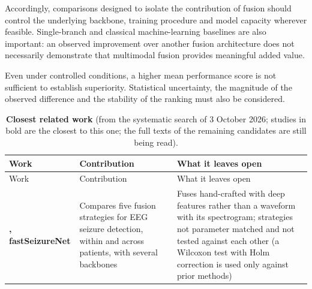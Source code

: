 \documentclass[11pt,a4paper]{article}
\begin{document}
Accordingly, comparisons designed to isolate the contribution of fusion should control
the underlying backbone, training procedure and model capacity wherever feasible.
Single-branch and classical machine-learning baselines are also important: an observed
improvement over another fusion architecture does not necessarily demonstrate that
multimodal fusion provides meaningful added value.

Even under controlled conditions, a higher mean performance score is not sufficient to
establish superiority. Statistical uncertainty, the magnitude of the observed difference
and the stability of the ranking must also be considered.

\begingroup\small

\begin{longtable}[]{@{}
  >{\raggedright\arraybackslash}p{}
  >{\raggedright\arraybackslash}p{}
  >{\raggedright\arraybackslash}p{}@{}}
\caption{\textbf{Closest related work} (from the systematic search of 3 October 2026; studies in bold are the closest to this one; the full texts of the remaining candidates are still being read).}\tabularnewline
\toprule\noalign{}
\begin{minipage}[b]{\linewidth}\raggedright
Work
\end{minipage} & \begin{minipage}[b]{\linewidth}\raggedright
Contribution
\end{minipage} & \begin{minipage}[b]{\linewidth}\raggedright
What it leaves open
\end{minipage} \\
\midrule\noalign{}
\endfirsthead
\toprule\noalign{}
\begin{minipage}[b]{\linewidth}\raggedright
Work
\end{minipage} & \begin{minipage}[b]{\linewidth}\raggedright
Contribution
\end{minipage} & \begin{minipage}[b]{\linewidth}\raggedright
What it leaves open
\end{minipage} \\
\midrule\noalign{}
\endhead
\bottomrule\noalign{}
\endlastfoot
\textbf{\citet{An_2026}, fastSeizureNet} & Compares five fusion strategies for EEG seizure detection, within and across patients, with several backbones & Fuses hand-crafted with deep features rather than a waveform with its spectrogram; strategies not parameter matched and not tested against each other (a Wilcoxon test with Holm correction is used only against prior methods) \\

\end{longtable}
\end{document}
